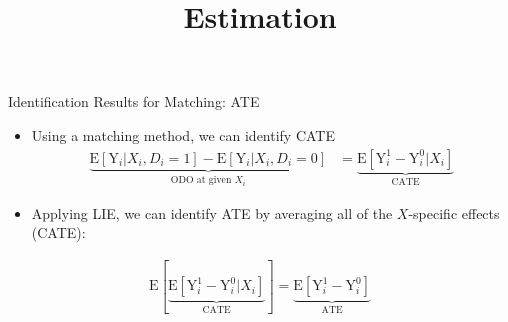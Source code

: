 \documentclass[hyperref={pdfpagelabels=false}]{beamer}
\begin{document}
\begin{frame}{Identification Results for Matching: ATE}
	\begin{itemize}
		
		\item Using a matching method, we can identify CATE
		\vspace{0.2cm}
		\begin{equation*}
			\begin{aligned}
				\underbrace{\mathrm{E}[\mathrm{Y}_{i}|X_{i},D_{i}=1] - \mathrm{E}[\mathrm{Y}_{i}|X_{i},D_{i}=0]}_{\text{ODO at given $X_{i}$}}  &= \underbrace{\mathrm{E}[\mathrm{Y}^{1}_{i}-\mathrm{Y}^{0}_{i}|X_{i}]}_{\text{CATE}} 
			\end{aligned}
		\end{equation*}	
		
		
		\item Applying LIE, we can identify ATE by averaging all of the $X$-specific effects (CATE):
		\vspace{0.2cm}
		
	\end{itemize}
	\begin{equation*}
		\begin{aligned}
			\mathrm{E}[\underbrace{\mathrm{E}[\mathrm{Y}^{1}_{i}-\mathrm{Y}^{0}_{i}|X_{i}]}_{\text{CATE}}] 
			=\underbrace{\mathrm{E}[\mathrm{Y}^{1}_{i}-\mathrm{Y}^{0}_{i}]}_{\text{ATE}}
			
		\end{aligned}
	\end{equation*}	
	
\end{frame}






\title[]  
{Estimation}


\author 
{}

\institute{}






\date
{}


\begin{frame}{}
\titlepage
\end{frame}
\end{document}
